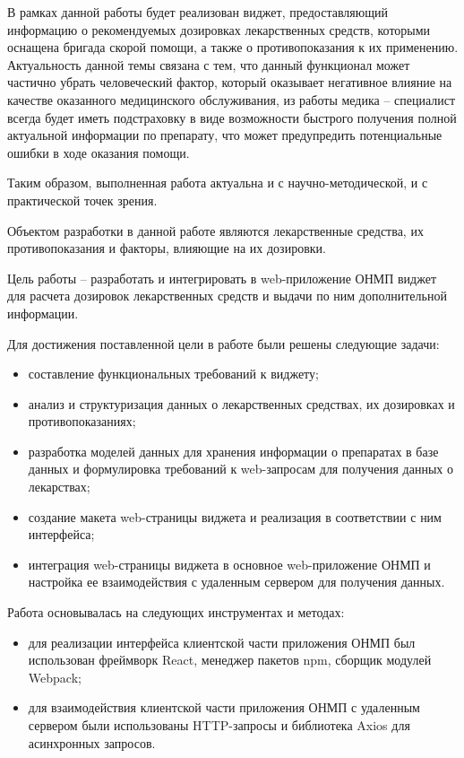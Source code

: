 В рамках данной работы будет реализован виджет, предоставляющий информацию о рекомендуемых дозировках лекарственных средств, которыми оснащена бригада скорой помощи, а также о противопоказания к их применению. Актуальность данной темы связана с тем, что данный функционал может частично убрать человеческий фактор, который оказывает негативное влияние на качестве оказанного медицинского обслуживания, из работы медика – специалист всегда будет иметь подстраховку в виде возможности быстрого получения полной актуальной информации по препарату, что может предупредить потенциальные ошибки в ходе оказания помощи. 

Таким образом, выполненная работа актуальна и с научно-методической, и с практической точек зрения.

Объектом разработки в данной работе являются лекарственные средства, их противопоказания и факторы, влияющие на их дозировки. 

Цель работы – разработать и интегрировать в web-приложение ОНМП виджет для расчета дозировок лекарственных средств и выдачи по ним дополнительной информации.

Для достижения поставленной цели в работе были решены следующие задачи:
\begin{itemize}
\item составление функциональных требований к виджету;

\item анализ и структуризация данных о лекарственных средствах, их дозировках и противопоказаниях;

\item разработка моделей данных для хранения информации о препаратах в базе данных и формулировка требований к web-запросам для получения данных о лекарствах;

\item создание макета web-страницы виджета и реализация в соответствии с ним интерфейса;

\item интеграция web-страницы виджета в основное web-приложение ОНМП и настройка ее взаимодействия  с удаленным сервером для получения данных.
\end{itemize}

Работа основывалась на следующих инструментах и методах:
\begin{itemize}
\item для реализации интерфейса клиентской части приложения ОНМП был использован фреймворк React, менеджер пакетов npm, сборщик модулей Webpack;

\item для взаимодействия клиентской части приложения ОНМП с удаленным сервером были использованы HTTP-запросы и библиотека Axios для асинхронных запросов.
\end{itemize}

